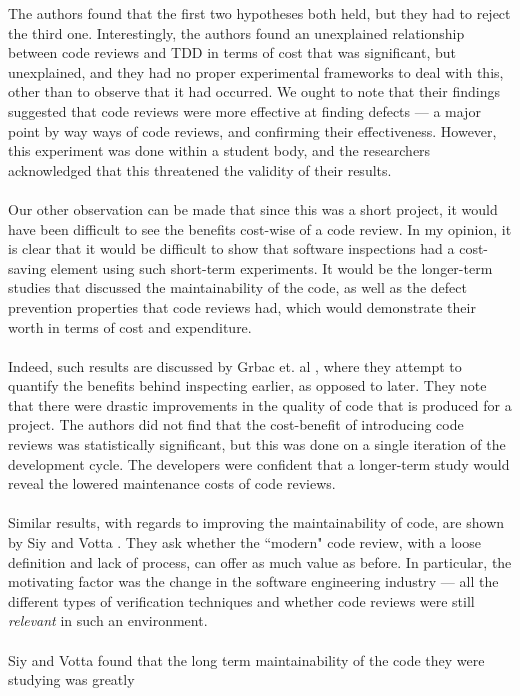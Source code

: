 The authors found that the first two hypotheses both held, but they had to reject the third one.
Interestingly, the authors found an unexplained relationship between code reviews and TDD in terms
of cost that was significant, but unexplained, and they had no proper experimental frameworks to
deal with this, other than to observe that it had occurred.
We ought to note that their findings suggested that code reviews were more effective at
finding defects --- a major point by way ways of code reviews, and confirming their effectiveness.
However, this experiment was done within a student body, and the researchers acknowledged that this
threatened the validity of their results.\\
\\
Our other observation can be made that since this was a short project, it would have been difficult
to see the benefits cost-wise of a code review.
In my opinion, it is clear that it would be difficult to show that software
inspections had a cost-saving element using such short-term experiments.
It would be the longer-term studies that discussed the maintainability of the code, as well as the
defect prevention properties that code reviews had, which would demonstrate their worth in terms of
cost and expenditure.\\
\\
Indeed, such results are discussed by Grbac et. al \cite{grbac2012quantifying}, where they attempt
to quantify the benefits behind inspecting earlier, as opposed to later.
They note that there were drastic improvements in the quality of code that is produced for a project.
The authors did not find that the cost-benefit of introducing code reviews was statistically
significant, but this was done on a single iteration of the development cycle.
The developers were confident that a longer-term study would reveal the lowered maintenance costs of
code reviews.\\
\\
Similar results, with regards to improving the maintainability of code, are shown by Siy and Votta
\cite{siy2001does}.
They ask whether the ``modern" code review, with a loose definition and lack of process, can offer
as much value as before.
In particular, the motivating factor was the change in the software engineering industry --- all the
different types of verification techniques and whether code reviews were still {\it relevant} in
such an environment.\\
\\
Siy and Votta found that the long term maintainability of the code they were studying was greatly

